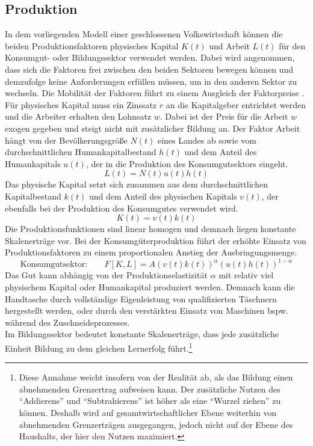 \subsection*{Produktion}
In dem vorliegenden Modell einer geschlossenen Volkswirtschaft können die beiden Produktionsfaktoren physisches Kapital $K(t)$ und Arbeit $L(t)$ für den Konsumgut- oder Bildungssektor verwendet werden. 
Dabei wird angenommen, dass sich die Faktoren frei zwischen den beiden Sektoren bewegen können und demzufolge keine Anforderungen erfüllen müssen, um in den anderen Sektor zu wechseln. Die Mobilität der Faktoren führt zu einem Ausgleich der Faktorpreise \citep{Samuelson.1941}. Für physisches Kapital muss ein Zinssatz $r$ an die Kapitalgeber entrichtet werden und die Arbeiter erhalten den Lohnsatz $w$. Dabei ist der Preis für die Arbeit $w$ exogen gegeben und steigt nicht mit zusätzlicher Bildung an. Der Faktor Arbeit hängt von der Bevölkerungsgrö{\ss}e $N(t)$ eines Landes ab sowie vom durchschnittlichen Humankapitalbestand $h(t)$ und dem Anteil des Humankapitals $u(t)$, der in die Produktion des Konsumgutsektors eingeht.
\begin{equation}
L(t)=N(t)u(t)h(t)
\label{eq:Arbeit}
\end{equation}
Das physische Kapital setzt sich zusammen aus dem durchschnittlichen Kapitalbestand $k(t)$ und dem Anteil des physischen Kapitals $v(t)$, der ebenfalls bei der Produktion des Konsumgutes verwendet wird. 
\begin{equation}
K(t)=v(t)k(t)
\label{eq:Kapital}
\end{equation}
Die Produktionsfunktionen sind linear homogen und demnach liegen konstante Skalenerträge vor. Bei der Konsumgüterproduktion führt der erhöhte Einsatz von Produktionsfaktoren zu einem proportionalen Anstieg der Ausbringungsmenge.
\begin{equation}
\text{Konsumgutsektor:}\qquad F[K,L]= A(v(t)k(t))^\alpha(u(t)h(t))^{1-\alpha}
\label{eq:ProduktionsfunktionK}
\end{equation}
Das Gut kann abhängig von der Produktionselastizität $\alpha$ mit relativ viel physischem Kapital oder Humankapital produziert werden. Demnach kann die Handtasche durch vollständige Eigenleistung von qualifizierten Täschnern hergestellt werden, oder durch den verstärkten Einsatz von Maschinen bspw. während des Zuschneideprozesses.\\
Im Bildungssektor bedeutet konstante Skalenerträge, dass jede zusätzliche Einheit Bildung zu dem gleichen Lernerfolg führt.\footnote{Diese Annahme weicht insofern von der Realität ab, als das Bildung einen abnehmenden Grenzertrag aufweisen kann. Der zusätzliche Nutzen des "`Addierens"' und "`Subtrahierens"' ist höher als eine "`Wurzel ziehen"' zu können. Deshalb wird auf gesamtwirtschaftlicher Ebene weiterhin von abnehmenden Grenzerträgen ausgegangen, jedoch nicht auf der Ebene des Haushalts, der hier den Nutzen maximiert.} 
